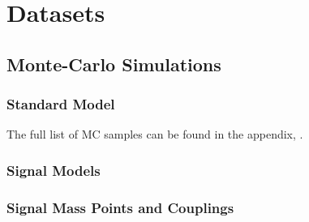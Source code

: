 
\chapter{Datasets}
\section{Monte-Carlo Simulations}
\subsection{Standard Model}
The full list of MC samples can be found in the appendix, .

\subsection{Signal Models}
\subsection{Signal Mass Points and Couplings}